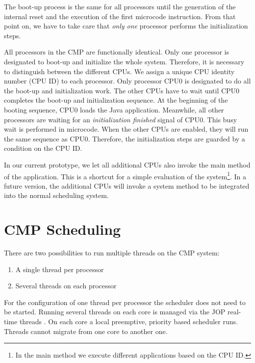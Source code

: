 The boot-up process is the same for all processors until the
generation of the internal reset and the execution of the first
microcode instruction. From that point on, we have to take care that
\emph{only one} processor performs the initialization steps.

All processors in the CMP are functionally identical. Only one
processor is designated to boot-up and initialize the whole system.
Therefore, it is necessary to distinguish between the different CPUs.
We assign a unique CPU identity number (CPU ID) to each processor.
Only processor CPU0 is designated to do all the boot-up and
initialization work. The other CPUs have to wait until CPU0 completes
the boot-up and initialization sequence. At the beginning of the
booting sequence, CPU0 loads the Java application. Meanwhile, all
other processors are waiting for an \emph{initialization finished}
signal of CPU0. This busy wait is performed in microcode. When the
other CPUs are enabled, they will run the same sequence as CPU0.
Therefore, the initialization steps are guarded by a condition on the
CPU ID.

In our current prototype, we let all additional CPUs also invoke the
main method of the application. This is a shortcut for a simple
evaluation of the system\footnote{In the main method we execute
different applications based on the CPU ID.}. In a future version,
the additional CPUs will invoke a system method to be integrated into
the normal scheduling system.


\section{CMP Scheduling}


There are two possibilities to run multiple threads on the CMP
system:

\begin{enumerate}
  \item A single thread per processor
  \item Several threads on each processor
\end{enumerate}

For the configuration of one thread per processor the scheduler does
not need to be started. Running several threads on each core is
managed via the JOP real-time threads . On each core a
local preemptive, priority based scheduler runs. Threads cannot
migrate from one core to another one.

